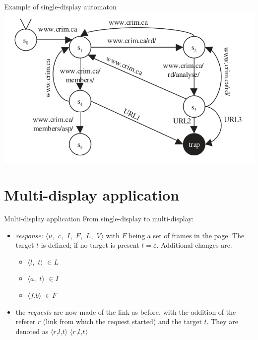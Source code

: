 \documentclass[usenames,dvipsnames]{beamer}
\newcommand{\tuple}[1]{\mbox{$\langle$#1$\rangle$}}
\newcommand{\reqmulti}[1][]{
  \ifthenelse{\equal{#1}{}} {\mbox{$\langle r$,$l$,$t\rangle$}}
  {\mbox{$\langle r_{#1}$,$l_{#1}$,$t_{#1}\rangle$}}
}
\newcommand{\resmulti}[1][]{
  \ifthenelse{\equal{#1}{}}{\mbox{$\langle u$, $c$, $I$, $F$, $L$, $V\rangle$}}
  {\mbox{$\langle u_{#1}$, $c_{#1}$, $I_{#1}$, $F_{#1}$, $L_{#1}$, $V_{#1}\rangle$}}
}
\theoremstyle{definition}
\begin{document}
\begin{frame}{Example of single-display automaton}
  \includegraphics[width=\textwidth]{../img/session_automaton_example.png}
\end{frame}

\section{Multi-display application}
\begin{frame}{Multi-display application}
  From single-display to multi-display:
  \begin{itemize}
    \item \textit{response:} \resmulti with $F$ being a set of frames in the page. The target $t$ is defined; if no target is present $t = \varepsilon$. Additional changes are:
      \begin{itemize}
        \item \tuple{$l$, $t$} $\in L$
        \item \tuple{$a$, $t$} $\in I$
        \item \tuple{$f$,$b$} $\in F$
      \end{itemize}
    \item the \textit{requests} are now made of the link as before, with the addition of the referer $r$ (link from which the request started) and the target $t$. They are denoted as \reqmulti
  \end{itemize}
\end{frame}
\end{document}
